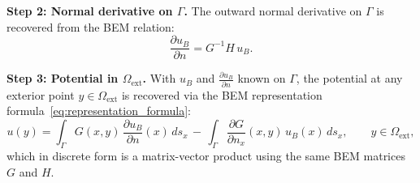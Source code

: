 \documentclass[11pt,onecolumn]{article}
\begin{document}
\textbf{Step 2: Normal derivative on $\Gamma$.}
The outward normal derivative on $\Gamma$ is recovered from the BEM 
relation:
\begin{equation}
\frac{\partial u_B}{\partial n} = G^{-1} H\, u_B.
\end{equation}

\textbf{Step 3: Potential in $\Omega_{\text{ext}}$.}
With $u_B$ and $\frac{\partial u_B}{\partial n}$ known on $\Gamma$, the potential at any 
exterior point $y \in \Omega_{\text{ext}}$ is recovered via the BEM representation 
formula~\eqref{eq:representation_formula}:
\begin{equation}
u(y) = \int_\Gamma G(x,y)\,\frac{\partial u_B}{\partial n}(x)\,ds_x 
\,-\, \int_\Gamma \frac{\partial G}{\partial n_x}(x,y)\,u_B(x)\,ds_x,
\qquad y \in \Omega_{\text{ext}},
\end{equation}
which in discrete form is a matrix-vector product using the same BEM matrices $G$ and $H$.
\end{document}
